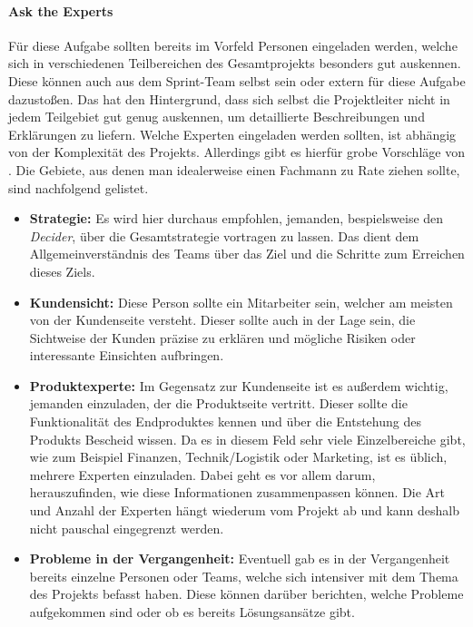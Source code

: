 \paragraph{Ask the Experts}
\label{sec:Sprint-Tag1-AtE}
Für diese Aufgabe sollten bereits im Vorfeld Personen eingeladen werden, welche sich in verschiedenen Teilbereichen des Gesamtprojekts besonders gut auskennen. Diese können auch aus dem Sprint-Team selbst sein oder extern für diese Aufgabe dazustoßen. Das hat den Hintergrund, dass sich selbst die Projektleiter nicht in jedem Teilgebiet gut genug auskennen, um detaillierte Beschreibungen und Erklärungen zu liefern. Welche Experten eingeladen werden sollten, ist abhängig von der Komplexität des Projekts. Allerdings gibt es hierfür grobe Vorschläge von .
Die Gebiete, aus denen man idealerweise einen Fachmann zu Rate ziehen sollte, sind nachfolgend gelistet. 
\begin{itemize}
	\item \textbf{Strategie:}
	Es wird hier durchaus empfohlen, jemanden, bespielsweise den \textit{Decider}, über die Gesamtstrategie vortragen zu lassen. Das dient dem Allgemeinverständnis des Teams über das Ziel und die Schritte zum Erreichen dieses Ziels. 
	\item \textbf{Kundensicht:}
	Diese Person sollte ein Mitarbeiter sein, welcher am meisten von der Kundenseite versteht. Dieser sollte auch in der Lage sein, die Sichtweise der Kunden präzise zu erklären und mögliche Risiken oder interessante Einsichten aufbringen.
	\item \textbf{Produktexperte:}
	Im Gegensatz zur Kundenseite ist es außerdem wichtig, jemanden einzuladen, der die Produktseite vertritt. Dieser sollte die Funktionalität des Endproduktes kennen und über die Entstehung des Produkts Bescheid wissen. Da es in diesem Feld sehr viele Einzelbereiche gibt, wie zum Beispiel Finanzen, Technik/Logistik oder Marketing, ist es üblich, mehrere Experten einzuladen. Dabei geht es vor allem darum, herauszufinden, wie diese Informationen zusammenpassen können. Die Art und Anzahl der Experten hängt wiederum vom Projekt ab und kann deshalb nicht pauschal eingegrenzt werden.
	\item \textbf{Probleme in der Vergangenheit:}
	Eventuell gab es in der Vergangenheit bereits einzelne Personen oder Teams, welche sich intensiver mit dem Thema des Projekts befasst haben. Diese können darüber berichten, welche Probleme aufgekommen sind oder ob es bereits Lösungsansätze gibt.
\end{itemize}

